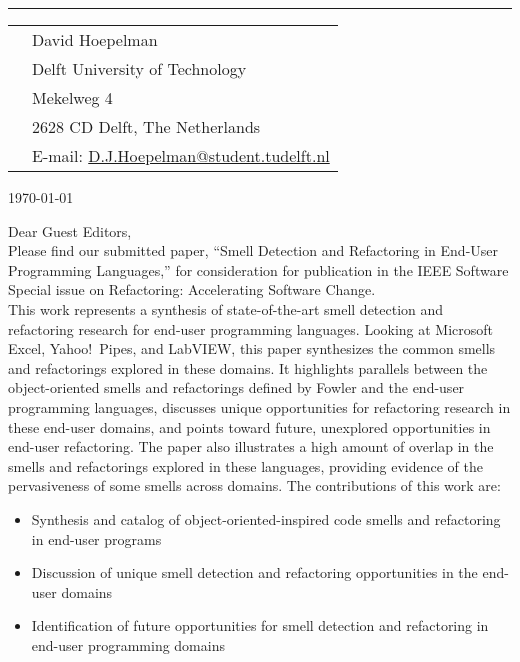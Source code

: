 \documentclass[9pt]{article}
\newcommand{\HRule}{\rule{\columnwidth}{0.25mm}}
\begin{document}
\vspace{-6pt}
\HRule

\vspace{20pt}

\begin{tabular}{p{3.90in}l}
&David Hoepelman\\
&Delft University of Technology\\
&Mekelweg 4\\
&2628 CD Delft, The Netherlands\\
& E-mail: \href{mailto:D.J.Hoepelman@student.tudelft.nl}{D.J.Hoepelman@student.tudelft.nl}\\
\end{tabular}

\vspace{20pt}

\begin{flushright}
\today
\end{flushright}

\vspace{20pt}

\noindent Dear Guest Editors,\\

\noindent Please find our submitted paper, ``Smell Detection and Refactoring in End-User Programming Languages,'' for consideration for publication in the IEEE Software Special issue on Refactoring: Accelerating Software Change. \\

\noindent This work represents a synthesis of state-of-the-art smell detection and refactoring research for end-user programming languages. 
Looking at Microsoft Excel, Yahoo!\ Pipes, and LabVIEW, this paper synthesizes the common smells and refactorings explored in these domains. It highlights parallels between the object-oriented smells and refactorings defined by Fowler and the end-user programming languages, discusses unique opportunities for refactoring research in these end-user domains, and points toward future, unexplored opportunities in end-user refactoring. The paper also illustrates a high amount of overlap in the smells and refactorings explored in these languages, providing evidence of the pervasiveness of some smells across domains. The contributions of this work are:
\begin{itemize}
	\item Synthesis and catalog of object-oriented-inspired code smells  and refactoring in end-user programs
	\item Discussion of unique smell detection and refactoring opportunities in the end-user domains 
	\item Identification of future opportunities for smell detection and refactoring in end-user programming domains
\end{itemize}
\end{document}
